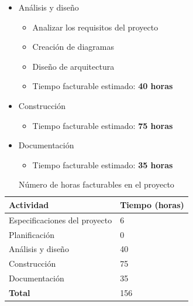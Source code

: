 \begin{itemize}
  \item Análisis y diseño
  \begin{itemize}
    \item{Analizar los requisitos del proyecto}
    \item{Creación de diagramas}
    \item{Diseño de arquitectura}
    \item{Tiempo facturable estimado: \textbf{40 horas}}
  \end{itemize}
\end{itemize}


\begin{itemize}
  \item Construcción
  \begin{itemize}
    \item{Tiempo facturable estimado: \textbf{75 horas}}
  \end{itemize}
\end{itemize}

\begin{itemize}
  \item Documentación
  \begin{itemize}
    \item{Tiempo facturable estimado: \textbf{35 horas}}
  \end{itemize}
\end{itemize}


\begin{table}[h]
\centering
\begin{tabular}{ll}
\hline
\rowcolor[HTML]{9698ED}
{\bf Actividad}               & {\bf Tiempo (horas)} \\ \hline
Especificaciones del proyecto & 6                    \\
Planificación                 & 0                    \\
Análisis y diseño             & 40                   \\
Construcción                  & 75                   \\
Documentación                 & 35                   \\
\rowcolor[HTML]{CBCEFB}
{\bf Total}                   & 156                  \\ \hline
\end{tabular}
\caption{Número de horas facturables en el proyecto}
\label{table:horasfacturables}
\end{table}


